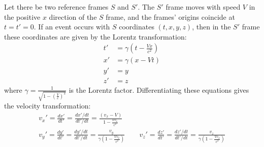 \documentclass[../p023main.tex]{subfiles}
\begin{document}
\begin{summary}
    Let there be two reference frames $S$ and $S'$.
    The $S'$ frame moves with speed $V$ in the positive $x$ direction of the $S$ frame, and the frames' origins coincide at $t = t' = 0$.
    If an event occurs with $S$ coordinates $(t, x, y, z)$, then in the $S'$ frame these coordinates are given by the Lorentz transformation:
    \begin{align*}
        t' &= \gamma \left( t - \frac{Vx}{c^2} \right) \\
        x' &= \gamma \left( x - Vt \right) \\
        y' &= y \\
        z' &= z
    \end{align*}
    where $\gamma = \frac{1}{\sqrt{1 - \left( \frac{V}{c} \right)^2}}$ is the Lorentz factor.
    Differentiating these equations gives the velocity transformation:
    \begin{gather*}
        v_x' = \frac{dx'}{dt'} = \frac{dx'/dt}{dt'/dt} = \frac{(v_x - V)}{1 - \frac{Vv_x}{c^2}} \\
        v_y' = \frac{dy'}{dt'} = \frac{dy'/dt}{dt'/dt} = \frac{v_y}{\gamma \left( 1 - \frac{Vv_x}{c^2} \right)} \qquad
        v_z' = \frac{dz'}{dt'} = \frac{dz'/dt}{dt'/dt} = \frac{v_z}{\gamma \left( 1 - \frac{Vv_x}{c^2} \right)}
    \end{gather*}
\end{summary}
    
\end{document}
